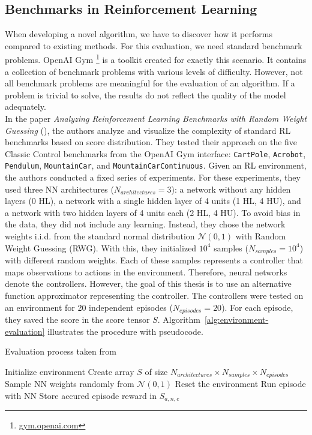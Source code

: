 \subsection{Benchmarks in Reinforcement Learning}
When developing a novel algorithm, we have to discover how it performs compared to existing methods.
For this evaluation, we need standard benchmark problems. OpenAI Gym \footnote{\url{gym.openai.com}} is a toolkit created for exactly this scenario. It contains a collection of benchmark problems with various levels of difficulty. However, not all benchmark problems are meaningful for the evaluation of an algorithm. If a problem is trivial to solve, the results do not reflect the quality of the model adequately. \\
In the paper \emph{Analyzing Reinforcement Learning Benchmarks with Random Weight Guessing} (\citet{oller_analyzing_2020}), the authors analyze and visualize the complexity of standard RL benchmarks based on score distribution. They tested their approach on the five Classic Control benchmarks from the OpenAI Gym interface: \verb|CartPole|, \verb|Acrobot|, \verb|Pendulum|, \verb|MountainCar|, and \verb|MountainCarContinuous|.
Given an RL environment, the authors conducted a fixed series of experiments. For these experiments, they used three NN architectures ($N_{architectures}=3$): a network without any hidden layers (0 HL), a network with a single hidden layer of 4 units (1 HL, 4 HU), and a network with two hidden layers of 4 units each (2 HL, 4 HU).
To avoid bias in the data, they did not include any learning. Instead, they chose the network weights i.i.d. from the standard normal distribution $\mathcal{N}(0,1)$ with Random Weight Guessing (RWG). With this, they initialized $10^4$ samples ($N_{samples}=10^4$) with different random weights. Each of these samples represents a controller that maps observations to actions in the environment. Therefore, neural networks denote the controllers. However, the goal of this thesis is to use an alternative function approximator representing the controller. The controllers were tested on an environment for 20 independent episodes ($N_{episodes}=20$). For each episode, they saved the score in the score tensor $S$. Algorithm~\ref{alg:environment-evaluation} illustrates the procedure with pseudocode.

\begin{algorithm}
\caption{Evaluation process taken from \citet{oller_analyzing_2020}}
\begin{algorithmic}[1]
\State Initialize environment
\State Create array $S$ of size $N_{architectures} \times N_{samples} \times N_{episodes}$
    \State Sample NN weights randomly from $\mathcal{N}(0,1)$
      \State Reset the environment
      \State Run episode with NN
      \State Store accured episode reward in $S_{a,n,e}$
    \EndFor
\EndFor
\end{algorithmic}
\label{alg:environment-evaluation}
\end{algorithm}

